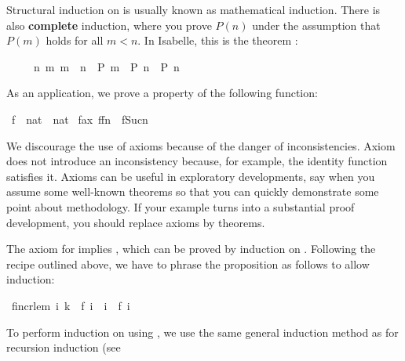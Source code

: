 \begin{isabellebody}
\begin{isamarkuptext}
Structural induction on  is
usually known as mathematical induction. There is also \textbf{complete}
%
induction, where you prove $P(n)$ under the assumption that $P(m)$
holds for all $m<n$. In Isabelle, this is the theorem :
\begin{isabelle}%
\ \ \ \ \ {\isacharparenleft}{\isasymAnd}n{\isachardot}\ {\isasymforall}m{\isachardot}\ m\ {\isacharless}\ n\ {\isasymlongrightarrow}\ P\ m\ {\isasymLongrightarrow}\ P\ n{\isacharparenright}\ {\isasymLongrightarrow}\ P\ n%
\end{isabelle}
As an application, we prove a property of the following
function:%
\end{isamarkuptext}%
\isamarkuptrue%
\ f\ {\isacharcolon}{\isacharcolon}\ {\isachardoublequote}nat\ {\isasymRightarrow}\ nat{\isachardoublequote}\isanewline
\isamarkupfalse%
\ f{\isacharunderscore}ax{\isacharcolon}\ {\isachardoublequote}f{\isacharparenleft}f{\isacharparenleft}n{\isacharparenright}{\isacharparenright}\ {\isacharless}\ f{\isacharparenleft}Suc{\isacharparenleft}n{\isacharparenright}{\isacharparenright}{\isachardoublequote}\isamarkupfalse%
%
\begin{isamarkuptext}%
\begin{warn}
We discourage the use of axioms because of the danger of
inconsistencies.  Axiom  does
not introduce an inconsistency because, for example, the identity function
satisfies it.  Axioms can be useful in exploratory developments, say when 
you assume some well-known theorems so that you can quickly demonstrate some
point about methodology.  If your example turns into a substantial proof
development, you should replace axioms by theorems.
\end{warn}\noindent
The axiom for  implies , which can
be proved by induction on \mbox{}. Following the recipe outlined
above, we have to phrase the proposition as follows to allow induction:%
\end{isamarkuptext}%
\isamarkuptrue%
\ f{\isacharunderscore}incr{\isacharunderscore}lem{\isacharcolon}\ {\isachardoublequote}{\isasymforall}i{\isachardot}\ k\ {\isacharequal}\ f\ i\ {\isasymlongrightarrow}\ i\ {\isasymle}\ f\ i{\isachardoublequote}\isamarkupfalse%
%
\begin{isamarkuptxt}%
\noindent
To perform induction on  using , we use
the same general induction method as for recursion induction (see

\end{isamarkuptxt}
\end{isabellebody}
